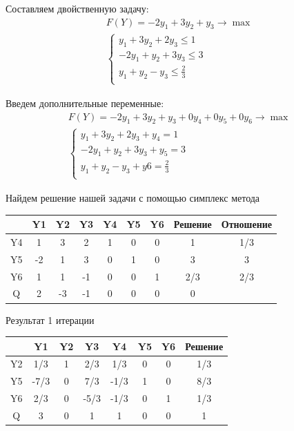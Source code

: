 \documentclass[a4paper, 12pt]{article}
\begin{document}
Составляем двойственную задачу:
\begin{align*}
  F(Y)=-2y_1+3y_2+y_3 \rightarrow \max\\
  \begin{cases}
    y_1+3y_2+2y_3 \leq 1\\
    -2y_1+y_2+3y_3 \leq 3\\
    y_1+y_2-y_3 \leq \frac{2}{3}\\
  \end{cases}
\end{align*}

Введем дополнительные переменные:
\begin{align*}
  F(Y)=-2y_1+3y_2+y_3+0y_4+0y_5+0y_6 \rightarrow \max\\
  \begin{cases}
    y_1+3y_2+2y_3+y_4 = 1\\
    -2y_1+y_2+3y_3+y_5 = 3\\
    y_1+y_2-y_3+y6 = \frac{2}{3}\\
  \end{cases} 
\end{align*}

Найдем решение нашей задачи с помощью симплекс метода
\begin{table}[H]
\centering
\begin{tabular}{|c|c|c|c|c|c|c|c|c|}
\hline
   & Y1 & \cellcolor[HTML]{FFCCC9}Y2 & Y3 & Y4 & Y5 & Y6 & Решение & Отношение \\ \hline
\rowcolor[HTML]{FFFC9E} 
Y4 & 1  & 3                          & 2  & 1  & 0  & 0  & 1       & 1/3       \\ \hline
Y5 & -2 & \cellcolor[HTML]{FFCCC9}1  & 3  & 0  & 1  & 0  & 3       & 3         \\ \hline
Y6 & 1  & \cellcolor[HTML]{FFCCC9}1  & -1 & 0  & 0  & 1  & 2/3     & 2/3       \\ \hline
Q  & 2 & \cellcolor[HTML]{FFCCC9}-3  & -1  & 0  & 0  & 0  & 0       &           \\ \hline
\end{tabular}
\end{table}

Результат 1 итерации
\begin{table}[H]
\centering
\begin{tabular}{|c|c|c|c|c|c|c|c|}
\hline
   & Y1   & Y2 & Y3   & Y4   & Y5 & Y6 & Решение \\ \hline
Y2 & 1/3  & 1  & 2/3  & 1/3  & 0  & 0  & 1/3     \\ \hline
Y5 & -7/3 & 0  & 7/3  & -1/3 & 1  & 0  & 8/3     \\ \hline
Y6 & 2/3  & 0  & -5/3 & -1/3 & 0  & 1  & 1/3     \\ \hline
Q  & 3    & 0  & 1    & 1    & 0  & 0  & 1       \\ \hline
\end{tabular}
\end{table}
\end{document}

